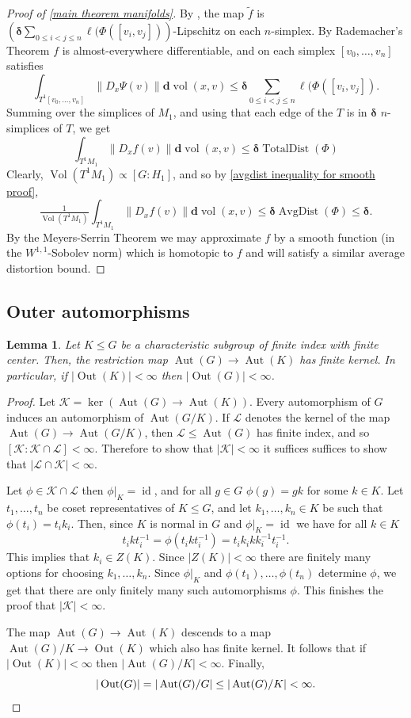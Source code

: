 \documentclass{amsart}
\numberwithin{equation}{section}
\newtheorem{lemma}[theorem]{Lemma}
\theoremstyle{definition}
\newcommand{\bfd}{\mathbf{d}}
\newcommand{\calK}{\mathcal{K}}
\newcommand{\calL}{\mathcal{L}}
\newcommand{\ii}{^{-1}}
\newcommand{\tild}[1]{\widetilde{#1}}
\newcommand{\bdelta}{{\boldsymbol\delta}}
\newcommand{\nir}[1]{\todo[inline, color=magenta]{#1}}
\DeclareMathOperator{\id}{id}
\DeclareMathOperator{\Aut}{Aut}
\DeclareMathOperator{\Out}{Out}
\DeclareMathOperator{\AD}{AvgDist}
\DeclareMathOperator{\TD}{TotalDist}
\DeclareMathOperator{\vol}{vol}
\DeclareMathOperator{\Vol}{Vol}
\begin{document}
\begin{proof}[Proof of \cref{main theorem manifolds}]
By , the map $\tild f$ is 
$\left(\bdelta \sum_{0\le i<j\le n}\ell(\Phi([v_i,v_j])\right)$-Lipschitz on each $n$-simplex.
By Rademacher's Theorem $f$ is almost-everywhere differentiable, and on each simplex $[v_0,\dots,v_n]$
satisfies 
$$\int_{T^1[v_0,\dots,v_n] } \|D_x\Psi(v)\|\bfd\vol(x,v)\le \bdelta \sum_{0\le i<j\le n}\ell(\Phi([v_i,v_j]).$$
Summing over the simplices of $M_1$, 
and using that each edge of the $T$ is in $\bdelta$ $n$-simplices of $T$, we get $$\int_{T^1M_1 } \|D_xf(v)\|\bfd\vol(x,v)\le \bdelta \TD(\Phi)$$
Clearly, $\Vol(T^1M_1)\propto [G:H_1]$, and so by \eqref{avgdist inequality for smooth proof},
$$\tfrac 1{\Vol(T^1M_1)}\int_{T^1M_1} \|D_xf(v)\|\bfd\vol(x,v)\le \bdelta \AD(\Phi)\le \bdelta.$$
By the Meyers-Serrin Theorem we may approximate $f$ by a smooth function (in the $W^{1,1}$-Sobolev norm) which is homotopic to $f$ and will satisfy a similar average distortion bound.
\end{proof}

\subsection{Outer automorphisms}
\begin{lemma}\label{out characteristic}
    Let $K\le G$ be a characteristic subgroup of finite index with finite center. Then, the restriction map  $\Aut(G)\to \Aut(K)$ has finite kernel. 
    In particular, if $|\Out(K)|<\infty$ then $|\Out(G)|<\infty$.
\end{lemma}

\begin{proof}
Let $\calK = \ker(\Aut(G)\to\Aut(K))$. 
Every automorphism of $G$ induces an automorphism of $\Aut(G/K)$. If $\calL$ denotes the kernel of the map $\Aut(G)\to \Aut(G/K)$, then $\calL\le \Aut(G)$ has finite index, and so $[\calK:\calK\cap \calL]<\infty$. Therefore to show that $|\calK|<\infty$ it suffices  suffices to show that $|\calL\cap \calK|<\infty$. 

Let $\phi\in \calK\cap \calL$ then $\phi|_K=\id$, and for all $g\in G$ $\phi(g)=gk$ for some $k\in K$.
Let $t_1,\dots,t_n$ be coset representatives of $K\le G$, and let $k_1,\dots,k_n\in K$ be such that $\phi(t_i)=t_ik_i$. Then, since $K$ is normal in $G$ and $\phi|_K=\id$ we have for all $k\in K$ 
$$t_ikt_i\ii=\phi(t_ikt_i\ii) = t_ik_ikk_i\ii t_i\ii.$$
This implies that $k_i\in Z(K)$. 
Since $|Z(K)|<\infty$ there are finitely many options for choosing $k_1,\dots,k_n$. 
Since $\phi|_K$ and $\phi(t_1),\dots,\phi(t_n)$ determine $\phi$, we get that there are only finitely many such automorphisms $\phi$.
This finishes the proof that $|\calK|<\infty$.

The map $\Aut(G)\to \Aut(K)$ descends to a map $\Aut(G)/K\to \Out(K)$ which also has finite kernel. It follows that if $|\Out(K)|<\infty$ then $|\Aut(G)/K|<\infty$.
Finally, $$|\Out(G)|=|\Aut(G)/G|\le|\Aut(G)/K|<\infty.\qedhere$$ 
\end{proof}
\end{document}
